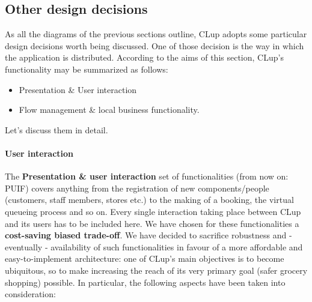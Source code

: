 \subsection{Other design decisions}
As all the diagrams of the previous sections outline, CLup adopts some particular design decisions worth being discussed. \newline
One of those decision is the way in which the application is distributed. According to the aims of this section, CLup's functionality may be summarized as follows:
\begin{itemize}
    \item Presentation \& User interaction
    \item Flow management \& local business functionality.
\end{itemize}
Let's discuss them in detail.
\paragraph{User interaction}
The \textbf{Presentation \& user interaction} set of functionalities (from now on: PUIF) covers anything from the registration of new components/people (customers, staff members, stores etc.) to the making of a booking, the virtual queueing process and so on. Every single interaction taking place between CLup and its users has to be included here. \newline
We have chosen for these functionalities a \textbf{cost-saving biased trade-off}. We have decided to sacrifice robustness and - eventually - availability of such functionalities in favour of a more affordable and easy-to-implement architecture: one of CLup's main objectives is to become ubiquitous, so to make  increasing the reach of its very primary goal (safer grocery shopping) possible.\newline
In particular, the following aspects have been taken into consideration:
